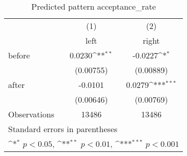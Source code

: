 \begin{table}[htbp]\centering
\def\sym#1{\ifmmode^{#1}\else\(^{#1}\)\fi}
\caption{Predicted pattern acceptance\_rate}
\begin{tabular}{l*{2}{c}}
\hline\hline
                    &\multicolumn{1}{c}{(1)}&\multicolumn{1}{c}{(2)}\\
                    &\multicolumn{1}{c}{left}&\multicolumn{1}{c}{right}\\
\hline
before              &      0.0230\sym{**} &     -0.0227\sym{*}  \\
                    &   (0.00755)         &   (0.00889)         \\
[1em]
after               &     -0.0101         &      0.0279\sym{***}\\
                    &   (0.00646)         &   (0.00769)         \\
\hline
Observations        &       13486         &       13486         \\
\hline\hline
\multicolumn{3}{l}{\footnotesize Standard errors in parentheses}\\
\multicolumn{3}{l}{\footnotesize \sym{*} \(p<0.05\), \sym{**} \(p<0.01\), \sym{***} \(p<0.001\)}\\
\end{tabular}
\end{table}
